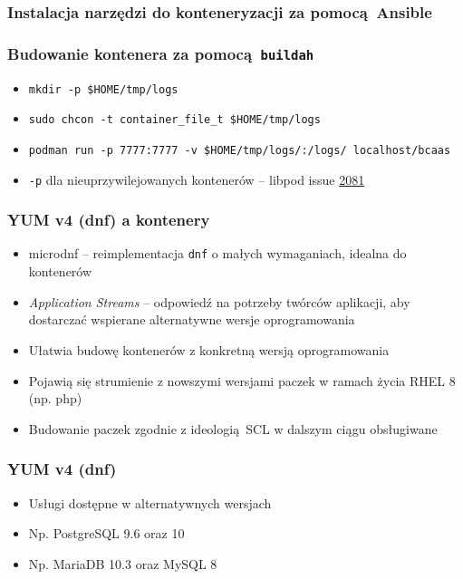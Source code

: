 \documentclass[dvipsnames,table]{beamer}
\begin{document}
\begin{frame}[fragile]
	\frametitle{Instalacja narzędzi do konteneryzacji za pomocą Ansible}
%	
\end{frame}

\begin{frame}[fragile]
	\frametitle{Budowanie kontenera za pomocą {\tt buildah}}
%
\begin{itemize}
	\item {\tt mkdir -p \$HOME/tmp/logs}
	\item {\tt sudo chcon -t container\_file\_t \$HOME/tmp/logs}
	\item {\tt podman run -p 7777:7777 -v \$HOME/tmp/logs/:/logs/ localhost/bcaas}
	\item {\tt -p} dla nieuprzywilejowanych kontenerów -- libpod issue \href{https://github.com/containers/libpod/issues/2081}{2081}
\end{itemize}
\end{frame}

\begin{frame}
\frametitle{YUM v4 (dnf) a kontenery}
\begin{itemize}
	\item microdnf -- reimplementacja {\tt dnf} o małych wymaganiach, idealna do kontenerów
	\item {\em Application Streams} -- odpowiedź na potrzeby twórców aplikacji, aby dostarczać wspierane alternatywne wersje oprogramowania
	\item Ułatwia budowę kontenerów z konkretną wersją oprogramowania
	\item Pojawią się strumienie z nowszymi wersjami paczek w ramach życia RHEL 8 (np. php)
	\item Budowanie paczek zgodnie z ideologią SCL w dalszym ciągu obsługiwane
\end{itemize}
\begin{center}
\end{center}
\end{frame}

\begin{frame}
\frametitle{YUM v4 (dnf)}
\begin{itemize}
	\item Usługi dostępne w alternatywnych wersjach
	\item Np. PostgreSQL 9.6 oraz 10
	\item Np. MariaDB 10.3 oraz MySQL 8
\end{itemize}
\end{frame}
\end{document}
